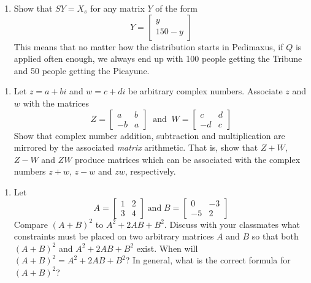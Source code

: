 \documentclass{ximera}
\begin{document}
\begin{enumerate}
\item \label{MClast} Show that $SY = X_{s}$ for any matrix $Y$ of the form \[Y = \left[ \begin{array}{r} y \\ 150 - y \end{array} \right]\] This means that no matter how the distribution starts in Pedimaxus, if $Q$ is applied often enough, we always end up with 100 people getting the Tribune and 50 people getting the Picayune.

\setcounter{HW}{\value{enumi}}
\end{enumerate}

\begin{enumerate}
\setcounter{enumi}{\value{HW}}

\item Let $z = a + bi$ and $w = c + di$ be arbitrary complex numbers.  Associate $z$ and $w$ with the matrices \[Z = \left[ \begin{array}{rr} a & b \\ -b & a \end{array} \right] \;\; \mbox{and} \;\; W = \left[ \begin{array}{rr} c & d \\ -d & c \end{array} \right]\]  Show that complex number addition, subtraction and multiplication are mirrored by the associated \emph{matrix} arithmetic.  That is, show that $Z + W$, $Z - W$ and $ZW$ produce matrices which can be associated with the complex numbers $z + w$, $z - w$ and $zw$, respectively.

\setcounter{HW}{\value{enumi}}
\end{enumerate}

\begin{enumerate}
\setcounter{enumi}{\value{HW}}

\item Let \[A = \left[ \begin{array}{rr} 1 & 2 \\ 3 & 4 \end{array} \right] \; \mbox{and} \; B = \left[ \begin{array}{rr} 0 & -3 \\ -5 & 2 \end{array} \right]\]  Compare $(A + B)^{2}$ to $A^{2} + 2AB + B^{2}$.  Discuss with your classmates what constraints must be placed on two arbitrary matrices $A$ and $B$ so that both $(A + B)^{2}$ and $A^{2} + 2AB + B^{2}$ exist.  When will $(A + B)^{2} = A^{2} + 2AB + B^{2}$?  In general, what is the correct formula for $(A + B)^{2}$?
\setcounter{HW}{\value{enumi}}
\end{enumerate}
\end{document}
